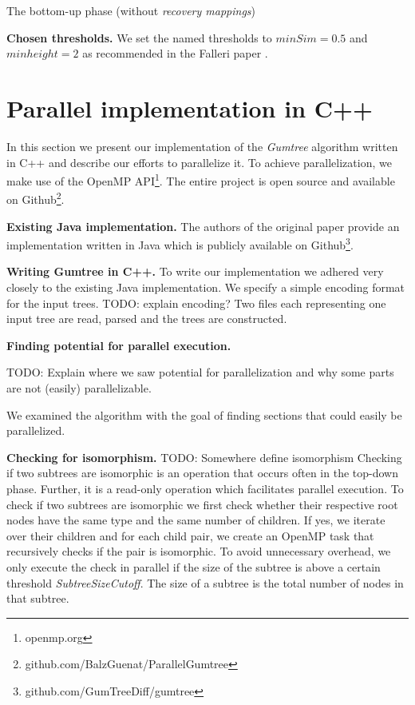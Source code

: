 \documentclass[letterpaper]{article}
\newcommand{\mypar}[1]{{\bf #1.}}
\begin{document}
\begin{algorithm}
\caption{The bottom-up phase (without \emph{recovery mappings})}
\label{alg:bottom-up}
\end{algorithm}

\mypar{Chosen thresholds}
We set the named thresholds to $minSim=0.5$ and $minheight=2$ as recommended in the Falleri paper \cite{falleri:2014:structure_diff}.

\section{Parallel implementation in C++}\label{sec:yourmethod}

In this section we present our implementation of the \emph{Gumtree} algorithm written in C++ and describe our efforts to parallelize it.
To achieve parallelization, we make use of the OpenMP API\footnote{openmp.org}.
The entire project is open source and available on Github\footnote{github.com/BalzGuenat/ParallelGumtree}.

\mypar{Existing Java implementation}
The authors of the original paper provide an implementation written in Java which is publicly available on Github\footnote{github.com/GumTreeDiff/gumtree}.

\mypar{Writing Gumtree in C++}
To write our implementation we adhered very closely to the existing Java implementation.
We specify a simple encoding format for the input trees.
TODO: explain encoding?
Two files each representing one input tree are read, parsed and the trees are constructed.

\mypar{Finding potential for parallel execution}

TODO: Explain where we saw potential for parallelization and why some parts are not (easily) parallelizable.

We examined the algorithm with the goal of finding sections that could easily be parallelized.

\mypar{Checking for isomorphism}
TODO: Somewhere define isomorphism
Checking if two subtrees are isomorphic is an operation that occurs often in the top-down phase.
Further, it is a read-only operation which facilitates parallel execution.
To check if two subtrees are isomorphic we first check whether their respective root nodes have the same type and the same number of children.
If yes, we iterate over their children and for each child pair, we create an OpenMP task that recursively checks if the pair is isomorphic.
To avoid unnecessary overhead, we only execute the check in parallel if the size of the subtree is above a certain threshold \emph{SubtreeSizeCutoff}.
The size of a subtree is the total number of nodes in that subtree.
\end{document}
